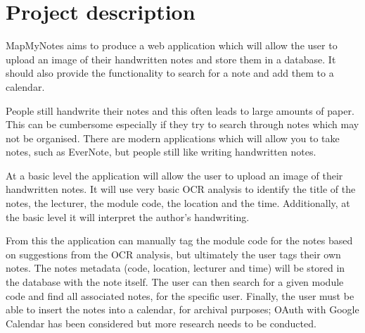 \documentclass[11pt,fleqn,twoside]{article}
\begin{document}
\wordcount{}

\mmp

\setcounter{tocdepth}{3} %


\section{Project description}
MapMyNotes aims to produce a web application which will allow the user to upload an image of their handwritten notes and store them in a database. It should also provide the functionality to search for a note and add them to a calendar.

People still handwrite their notes and this often leads to large amounts of paper. This can be cumbersome especially if they try to search through notes which may not be organised. There are modern applications which will allow you to take notes, such as EverNote, but people still like writing handwritten notes.

At a basic level the application will allow the user to upload an image of their handwritten notes. It will use very basic OCR analysis to identify the title of the notes, the lecturer, the module code, the location and the time. Additionally, at the basic level it will interpret the author's handwriting.

From this the application can manually tag the module code for the notes based on suggestions from the OCR analysis, but ultimately the user tags their own notes. The notes metadata (code, location, lecturer and time) will be stored in the database with the note itself. The user can then search for a given module code and find all associated notes, for the specific user. Finally, the user must be able to insert the notes into a calendar, for archival purposes; OAuth with Google Calendar has been considered but more research needs to be conducted.
\end{document}
